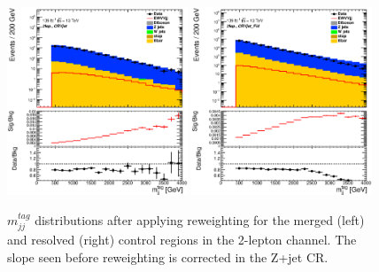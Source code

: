 \begin{figure}[ht]
    \centering
    \includegraphics[width=0.48\textwidth]{figures/2lep/reweighting/after_reweighting/C_0ptag1pfat0pjet_0ptv_CRVjet_MTagMerJets_Log.eps}
    \includegraphics[width=0.48\textwidth]{figures/2lep/reweighting/after_reweighting/C_0ptag2pjet_0ptv_CRVjet_Fid_MTagResJets_Log.eps}
    \caption{ $m^{tag}_{jj}$ distributions after applying reweighting for the merged (left) and resolved (right) control regions in the 2-lepton channel. The slope seen before reweighting is corrected in the Z+jet CR.}
    \label{fig:2lep_mtag_after_rw}
\end{figure}

